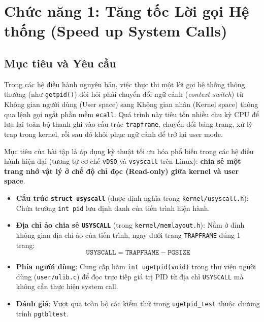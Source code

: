 \section{Chức năng 1: Tăng tốc Lời gọi Hệ thống (Speed up System Calls)}

\subsection{Mục tiêu và Yêu cầu}
Trong các hệ điều hành nguyên bản, việc thực thi một lời gọi hệ thống thông thường (như \texttt{getpid()}) đòi hỏi phải chuyển đổi ngữ cảnh (\textit{context switch}) từ Không gian người dùng (User space) sang Không gian nhân (Kernel space) thông qua lệnh gọi ngắt phần mềm \texttt{ecall}. Quá trình này tiêu tốn nhiều chu kỳ CPU để lưu lại toàn bộ thanh ghi vào cấu trúc \texttt{trapframe}, chuyển đổi bảng trang, xử lý trap trong kernel, rồi sau đó khôi phục ngữ cảnh để trở lại user mode.

Mục tiêu của bài tập là áp dụng kỹ thuật tối ưu hóa phổ biến trong các hệ điều hành hiện đại (tương tự cơ chế \texttt{vDSO} và \texttt{vsyscall} trên Linux): \textbf{chia sẻ một trang nhớ vật lý ở chế độ chỉ đọc (Read-only) giữa kernel và user space}. 
\begin{itemize}
    \item \textbf{Cấu trúc \texttt{struct usyscall}} (được định nghĩa trong \texttt{kernel/usyscall.h}):
    Chứa trường \texttt{int pid} lưu định danh của tiến trình hiện hành.
    \item \textbf{Địa chỉ ảo chia sẻ \texttt{USYSCALL}} (trong \texttt{kernel/memlayout.h}):
    Nằm ở đỉnh không gian địa chỉ ảo của tiến trình, ngay dưới trang \texttt{TRAPFRAME} đúng 1 trang:
    \begin{equation}
        \texttt{USYSCALL} = \texttt{TRAPFRAME} - \texttt{PGSIZE}
    \end{equation}
    \item \textbf{Phía người dùng}: Cung cấp hàm \texttt{int ugetpid(void)} trong thư viện người dùng (\texttt{user/ulib.c}) để đọc trực tiếp giá trị PID từ địa chỉ \texttt{USYSCALL} mà không cần thực hiện system call.
    \item \textbf{Đánh giá}: Vượt qua toàn bộ các kiểm thử trong \texttt{ugetpid\_test} thuộc chương trình \texttt{pgtbltest}.
\end{itemize}

